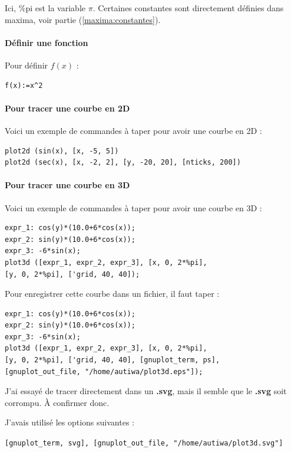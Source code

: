 \documentclass[a4paper,twoside]{article}
\begin{document}
\begin{remarque}
Ici, \%pi est la variable $\pi$. Certaines constantes sont directement définies dans maxima, voir partie (\ref{maxima:constantes}).
\end{remarque}

\paragraph{Définir une fonction}
Pour définir $f(x)$ :
\begin{verbatim}
f(x):=x^2
\end{verbatim}


\paragraph{Pour tracer une courbe en 2D}

Voici un exemple de commandes à taper pour avoir une courbe en 2D :

\begin{verbatim}
plot2d (sin(x), [x, -5, 5])
plot2d (sec(x), [x, -2, 2], [y, -20, 20], [nticks, 200])
\end{verbatim}

\paragraph{Pour tracer une courbe en 3D}

Voici un exemple de commandes à taper pour avoir une courbe en 3D :

\begin{verbatim}
expr_1: cos(y)*(10.0+6*cos(x));
expr_2: sin(y)*(10.0+6*cos(x));
expr_3: -6*sin(x);
plot3d ([expr_1, expr_2, expr_3], [x, 0, 2*%pi],
[y, 0, 2*%pi], ['grid, 40, 40]);
\end{verbatim}

Pour enregistrer cette courbe dans un fichier, il faut taper :

\begin{verbatim}
expr_1: cos(y)*(10.0+6*cos(x));
expr_2: sin(y)*(10.0+6*cos(x));
expr_3: -6*sin(x);
plot3d ([expr_1, expr_2, expr_3], [x, 0, 2*%pi],
[y, 0, 2*%pi], ['grid, 40, 40], [gnuplot_term, ps],
[gnuplot_out_file, "/home/autiwa/plot3d.eps"]);
\end{verbatim}

\begin{remarque}
J'ai essayé de tracer directement dans un \textbf{.svg}, mais il semble que le \textbf{.svg} soit corrompu. À confirmer donc.

J'avais utilisé les options suivantes :

\texttt{[gnuplot\_term, svg], [gnuplot\_out\_file, "/home/autiwa/plot3d.svg"]}
\end{remarque}
\end{document}
